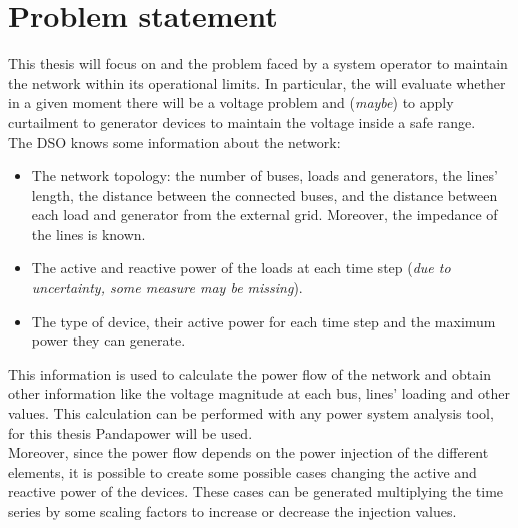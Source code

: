 \section{Problem statement}
\label{sec:ps}
This thesis will focus on  and the problem faced by a system operator to maintain the network within its operational limits. In particular, the  will evaluate whether in a given moment there will be a voltage problem and (\emph{maybe}) to apply curtailment to generator devices to maintain the voltage inside a safe range.\\

The \gls{DSO} knows some information about the network:
\begin{itemize}
    \item The network topology: the number of buses, loads and generators, the lines' length, the distance between the connected buses, and the distance between each load and generator from the external grid. Moreover, the impedance of the lines is known.
    \item The active and reactive power of the loads at each time step (\emph{due to uncertainty, some measure may be missing}).
    \item The type of  device, their active power for each time step and the maximum power they can generate.
\end{itemize}

This information is used to calculate the power flow of the network and obtain other information like the voltage magnitude at each bus, lines' loading and other values. This calculation can be performed with any power system analysis tool, for this thesis Pandapower will be used.\\

Moreover, since the power flow depends on the power injection of the different elements, it is possible to create some possible cases changing the active and reactive power of the devices. These cases can be generated multiplying the time series by some scaling factors to increase or decrease the injection values.  \\

